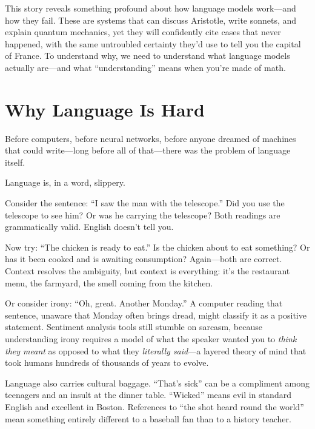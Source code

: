 \begin{cautionbox}
This story reveals something profound about how language models work---and how they fail. These are systems that can discuss Aristotle, write sonnets, and explain quantum mechanics, yet they will confidently cite cases that never happened, with the same untroubled certainty they'd use to tell you the capital of France. To understand why, we need to understand what language models actually are---and what ``understanding'' means when you're made of math.
\end{cautionbox}

\section{Why Language Is Hard}
\label{sec:why-language-hard}

Before computers, before neural networks, before anyone dreamed of machines that could write---long before all of that---there was the problem of language itself.

Language is, in a word, slippery.

Consider the sentence: ``I saw the man with the telescope.'' Did you use the telescope to see him? Or was he carrying the telescope? Both readings are grammatically valid. English doesn't tell you.

Now try: ``The chicken is ready to eat.'' Is the chicken about to eat something? Or has it been cooked and is awaiting consumption? Again---both are correct. Context resolves the ambiguity, but context is everything: it's the restaurant menu, the farmyard, the smell coming from the kitchen.

Or consider irony: ``Oh, great. Another Monday.'' A computer reading that sentence, unaware that Monday often brings dread, might classify it as a positive statement. Sentiment analysis tools still stumble on sarcasm, because understanding irony requires a model of what the speaker wanted you to \emph{think they meant} as opposed to what they \emph{literally said}---a layered theory of mind that took humans hundreds of thousands of years to evolve.

Language also carries cultural baggage. ``That's sick'' can be a compliment among teenagers and an insult at the dinner table. ``Wicked'' means evil in standard English and excellent in Boston. References to ``the shot heard round the world'' mean something entirely different to a baseball fan than to a history teacher.

